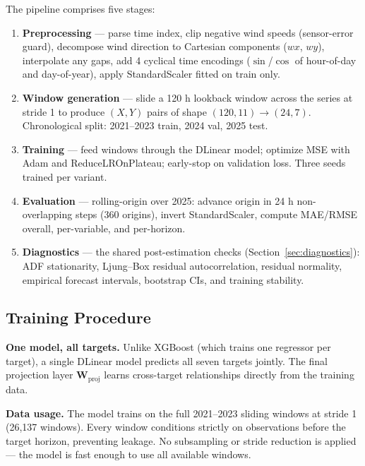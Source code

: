 \documentclass[12pt,a4paper,oneside]{report}
\begin{document}
The pipeline comprises five stages:
\begin{enumerate}
  \item \textbf{Preprocessing} --- parse time index, clip negative wind speeds
        (sensor-error guard), decompose wind direction to Cartesian components
        ($wx$, $wy$), interpolate any gaps, add 4 cyclical time encodings
        ($\sin$/$\cos$ of hour-of-day and day-of-year), apply StandardScaler
        fitted on train only.
  \item \textbf{Window generation} --- slide a 120 h lookback window across the
        series at stride 1 to produce $(X, Y)$ pairs of shape
        $(120, 11) \to (24, 7)$. Chronological split: 2021--2023 train, 2024
        val, 2025 test.
  \item \textbf{Training} --- feed windows through the DLinear model; optimize
        MSE with Adam and ReduceLROnPlateau; early-stop on validation loss.
        Three seeds trained per variant.
  \item \textbf{Evaluation} --- rolling-origin over 2025: advance origin in 24 h
        non-overlapping steps (360 origins), invert StandardScaler, compute
        MAE/RMSE overall, per-variable, and per-horizon.
  \item \textbf{Diagnostics} --- the shared post-estimation checks
        (Section~\ref{sec:diagnostics}): ADF stationarity, Ljung--Box residual
        autocorrelation, residual normality, empirical forecast intervals,
        bootstrap CIs, and training stability.
\end{enumerate}



\subsection{Training Procedure}

\textbf{One model, all targets.} Unlike XGBoost (which trains one regressor per
target), a single DLinear model predicts all seven targets jointly. The final
projection layer $\mathbf{W}_{\text{proj}}$ learns cross-target relationships
directly from the training data.

\textbf{Data usage.} The model trains on the full 2021--2023 sliding windows at
stride 1 (26,137 windows). Every window conditions strictly on observations
before the target horizon, preventing leakage. No subsampling or stride reduction
is applied --- the model is fast enough to use all available windows.
\end{document}

